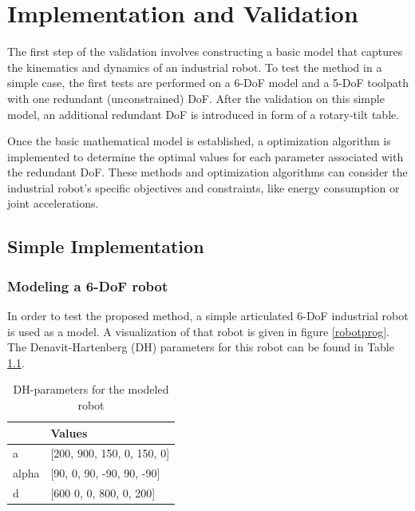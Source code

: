 \chapter{Implementation and Validation}%

The first step of the validation involves constructing a basic model that captures the kinematics and dynamics of an industrial robot. To test the method in a simple case, the first tests are performed on a 6-DoF model and a  5-DoF toolpath with one redundant (unconstrained) DoF. After the validation on this simple model, an additional redundant DoF is introduced in form of a rotary-tilt table. 

Once the basic mathematical model is established, a optimization algorithm is implemented to determine the optimal values for each parameter associated with the redundant DoF. These methods and optimization algorithms can consider the industrial robot's specific objectives and constraints, like energy consumption or joint accelerations. 



\section{Simple Implementation}%
\subsection{Modeling a 6-DoF robot}
In order to test the proposed method, a simple articulated 6-DoF industrial robot is used as a model. A visualization of that robot is given in figure \ref{robotprog}. The Denavit-Hartenberg (DH) parameters for this robot can be found in Table \ref{DH}.

\begin{table}[H]
	\centering
	\begin{tabular}{||l|l||}
		  & Values \\
		\hline
		\hline
		\hline
		a	&		[200, 900, 150, 0,   150, 0] \\
		alpha	&  	[90,  0,   90,  -90, 90,  -90] \\
		d	& 		[600  0,   0,   800, 0,   200]\\
		
		\hline
		\hline
	\end{tabular}
	
	\caption{DH-parameters for the modeled robot}
	\label{DH}
\end{table}

